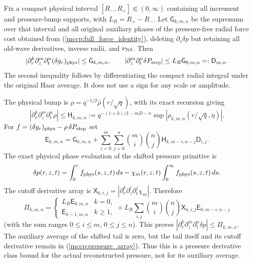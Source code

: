 \documentclass[11pt]{article}
\begin{document}
Fix a compact physical interval $[R_-,R_+]\Subset(0,\infty)$ containing
all increment and pressure-bump supports, with $L_R=R_+-R_-$. Let
$\mathsf G_{k,m,n}$ be the supremum over that interval and all original
auxiliary phases of the pressure-free radial force cost obtained from
(\ref{mccp:full_force_identity}), deleting $\partial_r\delta p$ but
retaining all old-wave derivatives, inverse radii, and $\nu_{\rm NS}$. Then
\begin{equation}\label{mccp:pressure_free}
 |\partial_r^k\partial_z^m\partial_t^n(\delta g_r)_{\rm phys}|
 \le\mathsf G_{k,m,n},\qquad
 |\partial_z^m\partial_t^n\delta P_{\rm step}|
 \le L_R\mathsf G_{0,m,n}=:\mathsf D_{m,n}.
\end{equation}
The second inequality follows by differentiating the compact radial
integral under the original Haar average. It does not use a sign for any
scale or amplitude.

The physical bump is $\rho=q^{-1/2}\widehat\rho(r/\sqrt q)$, with its
exact recursion giving
\[
 |\partial_r^k\partial_z^m\partial_t^n\rho|
 \le \mathsf H_{k,m,n}:=
 q^{-(1+k)/2-mD-n}\sup|\rho_{k,m,n}(r/\sqrt q,\eta)|.
\]
For $f=(\delta g_r)_{\rm phys}-\rho\,\delta P_{\rm step}$ set
\begin{equation}\label{mccp:pressure_source_array}
 \mathsf E_{k,m,n}=\mathsf G_{k,m,n}+
 \sum_{i=0}^m\sum_{j=0}^n\binom{m}{i}\binom{n}{j}
       \mathsf H_{k,m-i,n-j}\mathsf D_{i,j}.
\end{equation}
The exact physical phase evaluation of the shifted pressure primitive is
\[
 \delta p(r,z,t)=\int_0^r f_{\rm phys}(s,z,t)\,ds
 -\chi_m(r,z,t)\int_0^\infty f_{\rm phys}(s,z,t)\,ds.
\]
The cutoff derivative array is
$\mathsf X_{k,i,j}=|\partial_r^k\partial_z^i\partial_t^j\chi_m|$. Therefore
\begin{equation}\label{mccp:pressure_array}
 \mathsf\Pi_{k,m,n}=\begin{cases}L_R\mathsf E_{0,m,n}&k=0,\\
 \mathsf E_{k-1,m,n}&k\ge1,\end{cases}
 +L_R\sum_{i,j}\binom{m}{i}\binom{n}{j}
       \mathsf X_{k,i,j}\mathsf E_{0,m-i,n-j}
\end{equation}
(with the sum ranges $0\le i\le m$, $0\le j\le n$). This proves
$|\partial_r^k\partial_z^m\partial_t^n\delta p|\le\mathsf\Pi_{k,m,n}$.
The auxiliary average of the shifted tail is zero, but the tail itself and
its cutoff derivative remain in (\ref{mccp:pressure_array}). Thus this is a
pressure derivative class bound for the actual reconstructed pressure,
not for its auxiliary average.
\end{document}
